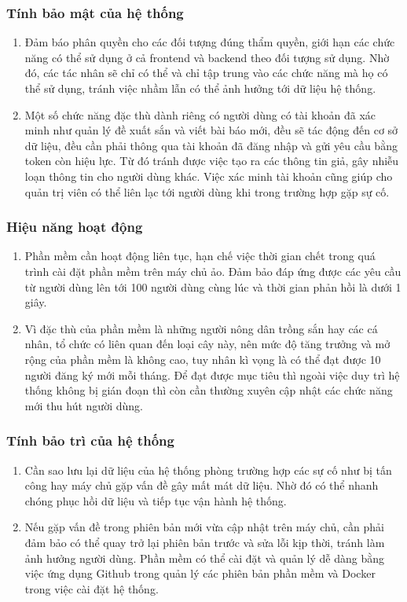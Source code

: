 \documentclass[./../main.tex]{subfiles}
\begin{document}
\subsubsection{Tính bảo mật của hệ thống}
\begin{enumerate}
    \item Đảm báo phân quyền cho các đối tượng đúng thẩm quyền, giới hạn các chức năng có thể sử dụng ở cả frontend và backend theo đối tượng sử dụng. Nhờ đó, các tác nhân sẽ chỉ có thể và chỉ tập trung vào các chức năng mà họ có thể sử dụng, tránh việc nhầm lẫn có thể ảnh hưởng tới dữ liệu hệ thống.
    \item Một số chức năng đặc thù dành riêng có người dùng có tài khoản đã xác minh như quản lý đề xuất sắn và viết bài báo mới, đều sẽ tác động đến cơ sở dữ liệu, đều cần phải thông qua tài khoản đã đăng nhập và gửi yêu cầu bằng token còn hiệu lực. Từ đó tránh được việc tạo ra các thông tin giả, gây nhiễu loạn thông tin cho người dùng khác. Việc xác minh tài khoản cũng giúp cho quản trị viên có thể liên lạc tới người dùng khi trong trường hợp gặp sự cố.
\end{enumerate}

\subsubsection{Hiệu năng hoạt động}
\begin{enumerate}
    \item Phần mềm cần hoạt động liên tục, hạn chế việc thời gian chết trong quá trình cài đặt phần mềm trên máy chủ ảo. Đảm bảo đáp ứng được các yêu cầu từ người dùng lên tới 100 người dùng cùng lúc và thời gian phản hồi là dưới 1 giây.
    \item Vì đặc thù của phần mềm là những người nông dân trồng sắn hay các cá nhân, tổ chức có liên quan đến loại cây này, nên mức độ tăng trưởng và mở rộng của phần mềm là không cao, tuy nhân kì vọng là có thể đạt được 10 người đăng ký mới mỗi tháng. Để đạt được mục tiêu thì ngoài việc duy trì hệ thống không bị gián đoạn thì còn cần thường xuyên cập nhật các chức năng mới thu hút người dùng.
\end{enumerate}

\subsubsection{Tính bảo trì của hệ thống}
\begin{enumerate}
    \item Cần sao lưu lại dữ liệu của hệ thống phòng trường hợp các sự cố như bị tấn công hay máy chủ gặp vấn đề gây mất mát dữ liệu. Nhờ đó có thể nhanh chóng phục hồi dữ liệu và tiếp tục vận hành hệ thống.
    \item Nếu gặp vấn đề trong phiên bản mới vừa cập nhật trên máy chủ, cần phải đảm bảo có thể quay trở lại phiên bản trước và sửa lỗi kịp thời, tránh làm ảnh hưởng người dùng. Phần mềm có thể cài đặt và quản lý dễ dàng bằng việc ứng dụng Github trong quản lý các phiên bản phần mềm và Docker trong việc cài đặt hệ thống.
\end{enumerate}
\end{document}
